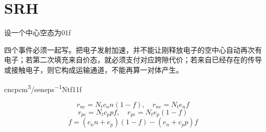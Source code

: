 \documentclass[11pt,a4paper]{article}
\begin{document}
\section{SRH\allowbreak{}}\label{sec:13}
{\cjkfont 设一个中心空态为}\allowbreak{}0\allowbreak{}1\allowbreak{}f\allowbreak{}
\par
{\cjkfont 四个事件必须一起写。把电子发射加速，并不能让刚释放电子的空中心自动再次有电子；若第二次填充来自价态，就必须支付对应跨隙代价；若来自已经存在的传导或接触电子，则它构成运输通道，不能再算一对体产生。}\allowbreak{}
\par
cn\allowbreak{}cp\allowbreak{}cm\textsuperscript{3}/s\allowbreak{}en\allowbreak{}ep\allowbreak{}s\textsuperscript{−1}\allowbreak{}Nt\allowbreak{}f\allowbreak{}1\allowbreak{}1\allowbreak{}f\allowbreak{}
\par
\begin{equation}
r_{nc}=N_tc_n n(1-f),\quad r_{ne}=N_te_nf
\label{eq:8}\end{equation}
\begin{equation}
r_{pc}=N_tc_p pf,\quad r_{pe}=N_te_p(1-f)
\label{eq:9}\end{equation}
\begin{equation}
\dot f=(c_n n+e_p)(1-f)-(e_n+c_p p)f
\label{eq:10}\end{equation}
\end{document}
